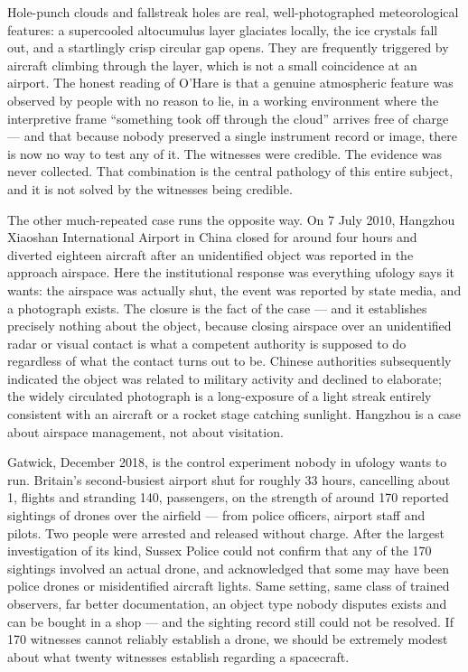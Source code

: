 Hole-punch clouds and fallstreak holes are real, well-photographed meteorological features: a
supercooled altocumulus layer glaciates locally, the ice crystals fall out, and a startlingly
crisp circular gap opens. They are frequently triggered by aircraft climbing through the layer,
which is not a small coincidence at an airport. The honest reading of O'Hare is that a genuine
atmospheric feature was observed by people with no reason to lie, in a working environment where
the interpretive frame ``something took off through the cloud'' arrives free of charge --- and
that because nobody preserved a single instrument record or image, there is now no way to test
any of it. The witnesses were credible. The evidence was never collected. That combination is the
central pathology of this entire subject, and it is not solved by the witnesses being credible.

The other much-repeated case runs the opposite way. On 7 July 2010, Hangzhou Xiaoshan
International Airport in China closed for around four hours and diverted eighteen aircraft after
an unidentified object was reported in the approach airspace. Here the institutional response was
everything ufology says it wants: the airspace was actually shut, the event was reported by state
media, and a photograph exists. The closure is the fact of the case --- and it establishes
precisely nothing about the object, because closing airspace over an unidentified radar or visual
contact is what a competent authority is supposed to do regardless of what the contact turns out
to be. Chinese authorities subsequently indicated the object was related to military activity and
declined to elaborate; the widely circulated photograph is a long-exposure of a light streak
entirely consistent with an aircraft or a rocket stage catching sunlight. Hangzhou is a case about
airspace management, not about visitation.

\begin{funfact}
Gatwick, December 2018, is the control experiment nobody in ufology wants to run. Britain's
second-busiest airport shut for roughly 33 hours, cancelling about 1, flights and stranding
140, passengers, on the strength of around 170 reported sightings of drones over the
airfield --- from police officers, airport staff and pilots. Two people were arrested and
released without charge. After the largest investigation of its kind, Sussex Police could not
confirm that any of the 170 sightings involved an actual drone, and acknowledged that some may
have been police drones or misidentified aircraft lights. Same setting, same class of trained
observers, far better documentation, an object type nobody disputes exists and can be bought in a
shop --- and the sighting record still could not be resolved. If 170 witnesses cannot reliably
establish a drone, we should be extremely modest about what twenty witnesses establish regarding
a spacecraft.
\end{funfact}

